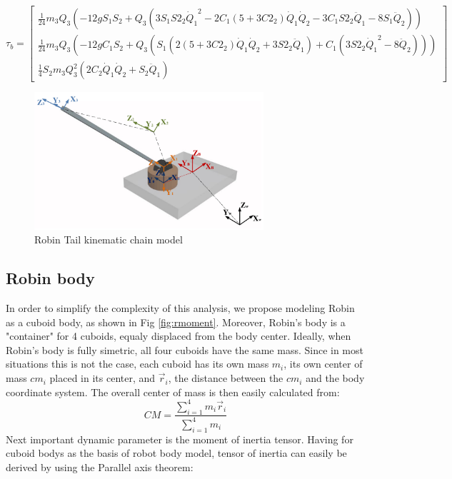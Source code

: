 \tiny
\begin{equation}
\tau_b=\begin{bmatrix}
\frac{1}{24} m_3 Q_3 \left(-12 g S_1 S_2+Q_3 \left(3 S_1 S2_2 {\dot{Q}_1}^2-2 C_1\left(5+3 C2_2\right) \dot{Q}_1 \dot{Q}_2-3 C_1 S2_2 \ddot{Q}_1-8 S_1 \ddot{Q}_2\right)\right)\\
\frac{1}{24} m_3 Q_3 \left(-12 g C_1 S_2+Q_3 \left(S_1\left( 2(5+3C2_2)\dot{Q}_1 \dot{Q}_2+3S2_2\ddot{Q}_1\right)+C_1(3S2_2{\dot{Q}_1}^2-8\ddot{Q}_2)\right)\right)\\
\frac{1}{4} S_2 m_3 Q_3^2 \left(2 C_2 \dot{Q}_1 \dot{Q}_2+S_2 \ddot{Q}_1\right)
\end{bmatrix}
\end{equation}
\normalsize

\begin{figure}
	\centering
	\includegraphics[width=85mm]{./pictures/RobinRepic.pdf}
	\caption{Robin Tail kinematic chain model}
	\label{fig:rmax}
\end{figure}

\subsection{Robin body}
In order to simplify the complexity of this analysis, we propose modeling Robin as a cuboid body, as shown in Fig \ref{fig:rmoment}. Moreover, Robin's body is a "container" for 4 cuboids, equaly displaced from the body center. Ideally, when Robin's body is fully simetric, all four cuboids have the same mass. Since in most situations this is not the case, each cuboid has its own mass $m_i$, its own center of mass $cm_i$ placed in its center, and $\vec{r}_i$, the distance between the $cm_i$ and the body coordinate system. The overall center of mass is then easily calculated from: 
\begin{equation}\label{eq:CMrobot}
CM=\frac{\sum_{i=1}^{4}m_i\vec{r}_i}{\sum_{i=1}^{4}m_i}
\end{equation}
Next important dynamic parameter is the moment of inertia tensor. Having for cuboid bodys as the basis of robot body model, tensor of inertia can easily be derived by using the Parallel axis theorem:

